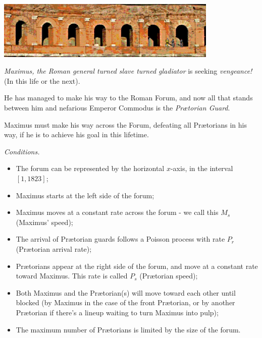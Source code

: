 

\begin{center}
	\includegraphics*[width=300pt]{images/project-maximus-screenshot.png}
\end{center}


\emph{Maximus, the Roman general turned slave turned gladiator} is seeking \emph{vengeance!} (In this life or the next).


He has managed to make his way to the Roman Forum, and now all that stands between him and nefarious Emperor Commodus is the \emph{Pr{\ae}torian Guard}.

Maximus must make his way across the Forum, defeating all Pr{\ae}torians in his way, if he is to achieve his goal in this lifetime.

\begin{graybox}
\emph{Conditions. }
\begin{itemize}
	\item The forum can be represented by the horizontal $x$-axis, in the interval $[1,1823]$;
	\item Maximus starts at the left side of the forum;
	\item Maximus moves at a constant rate across the forum - we call this $M_s$ (Maximus' speed);
	\item The arrival of Pr{\ae}torian guards follows a Poisson process with rate $P_r$ (Pr{\ae}torian arrival rate);
	\item Pr{\ae}torians appear at the right side of the forum, and move at a constant rate toward Maximus. This rate is called $P_s$ (Pr{\ae}torian speed);
	\item Both Maximus and the Pr{\ae}torian(s) will move toward each other until blocked (by Maximus in the case of the front Pr{\ae}torian, or by another Pr{\ae}torian if there's a lineup waiting to turn Maximus into pulp);
	\item The maximum number of Pr{\ae}torians is limited by the size of the forum.
\end{itemize}
\end{graybox}

